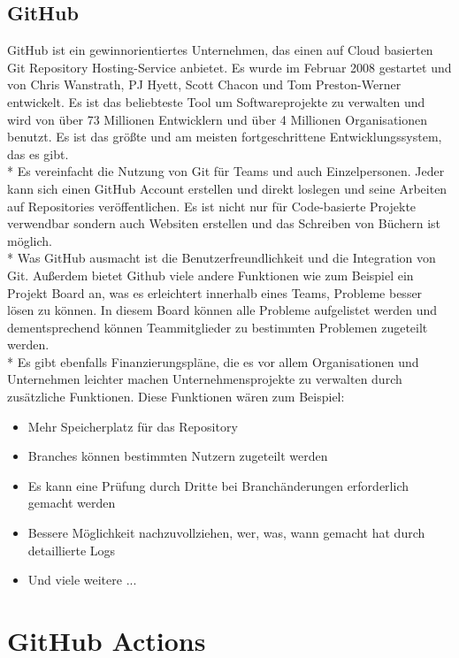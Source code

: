 \subsection{GitHub}
GitHub ist ein gewinnorientiertes Unternehmen, das einen auf Cloud basierten Git Repository Hosting-Service anbietet.
Es wurde im Februar 2008 gestartet und von Chris Wanstrath, PJ Hyett, Scott Chacon und Tom Preston-Werner entwickelt.
Es ist das beliebteste Tool um Softwareprojekte zu verwalten und wird von über 73 Millionen Entwicklern und über 4 Millionen Organisationen
benutzt. Es ist das größte und am meisten fortgeschrittene Entwicklungssystem, das es gibt. \cite{GitHub} \\*
Es vereinfacht die Nutzung von Git für Teams und auch Einzelpersonen. 
Jeder kann sich einen GitHub Account erstellen und direkt loslegen und seine Arbeiten auf Repositories veröffentlichen.
Es ist nicht nur für Code-basierte Projekte verwendbar sondern auch Websiten erstellen und das Schreiben von Büchern ist möglich.
\\*
Was GitHub ausmacht ist die Benutzerfreundlichkeit und die Integration von Git. Außerdem bietet Github viele andere Funktionen wie zum Beispiel ein Projekt Board an,
was es erleichtert innerhalb eines Teams, Probleme besser lösen zu können. In diesem Board können alle Probleme aufgelistet werden und dementsprechend können Teammitglieder zu bestimmten Problemen 
zugeteilt werden.   \\*
Es gibt ebenfalls Finanzierungspläne, die es vor allem Organisationen und Unternehmen leichter machen Unternehmensprojekte zu verwalten durch zusätzliche Funktionen. \cite{GitKinsta}
Diese Funktionen wären zum Beispiel:
\begin{itemize}
    \item Mehr Speicherplatz für das Repository
    \item Branches können bestimmten Nutzern zugeteilt werden 
    \item Es kann eine Prüfung durch Dritte bei Branchänderungen erforderlich gemacht werden
    \item Bessere Möglichkeit nachzuvollziehen, wer, was, wann gemacht hat durch detaillierte Logs
    \item Und viele weitere ...
\end{itemize}



\section{GitHub Actions}
\label{sec:GHAction}
\author{Benjamin Besic}

